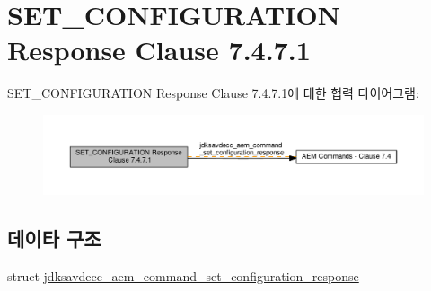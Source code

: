 \hypertarget{group__command__set__configuration__response}{}\section{S\+E\+T\+\_\+\+C\+O\+N\+F\+I\+G\+U\+R\+A\+T\+I\+ON Response Clause 7.4.7.1}
\label{group__command__set__configuration__response}
S\+E\+T\+\_\+\+C\+O\+N\+F\+I\+G\+U\+R\+A\+T\+I\+ON Response Clause 7.4.7.1에 대한 협력 다이어그램\+:
\nopagebreak
\begin{figure}[H]
\begin{center}
\leavevmode
\includegraphics[width=350pt]{group__command__set__configuration__response}
\end{center}
\end{figure}
\subsection*{데이타 구조}
\begin{DoxyCompactItemize}
\item 
struct \hyperlink{structjdksavdecc__aem__command__set__configuration__response}{jdksavdecc\+\_\+aem\+\_\+command\+\_\+set\+\_\+configuration\+\_\+response}
\end{DoxyCompactItemize}
